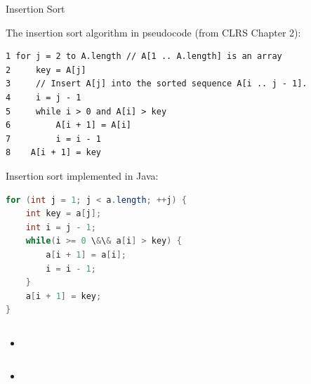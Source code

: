 \documentclass{beamer}
\begin{document}
\begin{frame}[fragile]{Insertion Sort}


The insertion sort algorithm in pseudocode (from CLRS Chapter 2):
\vspace{-.05in}
\begin{lstlisting}[]
1 for j = 2 to A.length // A[1 .. A.length] is an array
2     key = A[j]
3     // Insert A[j] into the sorted sequence A[i .. j - 1].
4     i = j - 1
5     while i > 0 and A[i] > key
6         A[i + 1] = A[i]
7         i = i - 1
8    A[i + 1] = key
\end{lstlisting}

Insertion sort implemented in Java:
\vspace{-.05in}
\begin{lstlisting}[language=Java]
for (int j = 1; j < a.length; ++j) {
    int key = a[j];
    int i = j - 1;
    while(i >= 0 \&\& a[i] > key) {
        a[i + 1] = a[i];
        i = i - 1;
    }
    a[i + 1] = key;
}
\end{lstlisting}

\end{frame}


\begin{frame}[fragile]{}


\begin{lstlisting}[language=Java]

\end{lstlisting}

\begin{itemize}
\item
\end{itemize}


\end{frame}


\begin{frame}[fragile]{}


\begin{lstlisting}[language=Java]

\end{lstlisting}

\begin{itemize}
\item
\end{itemize}


\end{frame}
\end{document}
